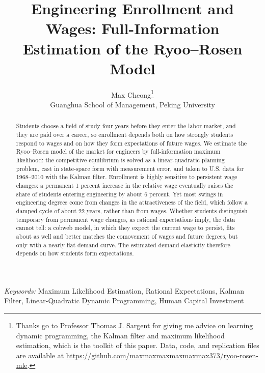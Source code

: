 \documentclass[12pt]{article}
\begin{document}
\def\spacingset#1{\renewcommand{\baselinestretch}%
{#1}\small\normalsize} \spacingset{1}


\title{\bf Engineering Enrollment and Wages: Full-Information Estimation of the Ryoo--Rosen Model}
\author{Max Cheong\thanks{
    Thanks go to Professor Thomas J. Sargent for giving me advice on learning dynamic programming, the Kalman filter and maximum likelihood estimation, which is the toolkit of this paper. Data, code, and replication files are available at \url{https://github.com/maxmaxmaxmaxmaxmax373/ryoo-rosen-mle}.}\hspace{.2cm}\\
    Guanghua School of Management, Peking University\\}
\maketitle

\begin{abstract}
Students choose a field of study four years before they enter the labor market, and they are paid over a career, so enrollment depends both on how strongly students respond to wages and on how they form expectations of future wages. We estimate the Ryoo--Rosen model of the market for engineers by full-information maximum likelihood: the competitive equilibrium is solved as a linear-quadratic planning problem, cast in state-space form with measurement error, and taken to U.S. data for 1968--2010 with the Kalman filter. Enrollment is highly sensitive to persistent wage changes: a permanent 1 percent increase in the relative wage eventually raises the share of students entering engineering by about 6 percent. Yet most swings in engineering degrees come from changes in the attractiveness of the field, which follow a damped cycle of about 22 years, rather than from wages. Whether students distinguish temporary from permanent wage changes, as rational expectations imply, the data cannot tell: a cobweb model, in which they expect the current wage to persist, fits about as well and better matches the comovement of wages and future degrees, but only with a nearly flat demand curve. The estimated demand elasticity therefore depends on how students form expectations.
\end{abstract}

\bigskip
\noindent%
{\it Keywords:} Maximum Likelihood Estimation, Rational Expectations, Kalman Filter, Linear-Quadratic Dynamic Programming, Human Capital Investment
\vfill
\end{document}
